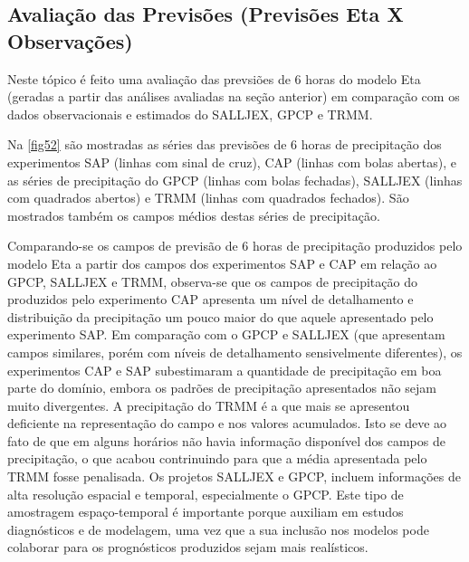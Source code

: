 \subsection{Avaliação das Previsões (Previsões Eta X Observações)}
\label{ss:avalprev}

Neste tópico é feito uma avaliação das prevsiões de 6 horas do modelo Eta (geradas a partir das análises avaliadas na seção anterior) em comparação com os dados observacionais e estimados do SALLJEX, GPCP e TRMM.

Na \autoref{fig52} são mostradas as séries das previsões de 6 horas de precipitação dos experimentos SAP (linhas com sinal de cruz), CAP (linhas com bolas abertas),  e as séries de precipitação do GPCP (linhas com bolas fechadas),  SALLJEX (linhas com quadrados abertos) e TRMM (linhas com quadrados fechados). São mostrados também os campos médios destas séries de precipitação.

Comparando-se os campos de previsão de 6 horas de precipitação produzidos pelo modelo Eta a partir dos campos dos experimentos SAP e CAP em relação ao GPCP, SALLJEX e TRMM, observa-se que os campos de precipitação do produzidos pelo experimento CAP apresenta um nível de detalhamento e distribuição da precipitação um pouco maior do que aquele apresentado pelo experimento SAP. Em comparação com o GPCP e SALLJEX (que apresentam campos similares, porém com níveis de detalhamento sensivelmente diferentes), os experimentos CAP e SAP subestimaram a quantidade de precipitação em boa parte do domínio, embora os padrões de precipitação apresentados não sejam muito divergentes. A precipitação do TRMM é a que mais se apresentou deficiente na representação do campo e nos valores acumulados. Isto se deve ao fato de que em alguns horários não havia informação disponível dos campos de precipitação, o que acabou contrinuindo para que a média apresentada pelo TRMM fosse penalisada. Os projetos SALLJEX e GPCP, incluem informações de alta resolução espacial e temporal, especialmente o GPCP. Este tipo de amostragem espaço-temporal é importante porque auxiliam em estudos diagnósticos e de modelagem, uma vez que a sua inclusão nos modelos pode colaborar para os prognósticos produzidos sejam mais realísticos. 

